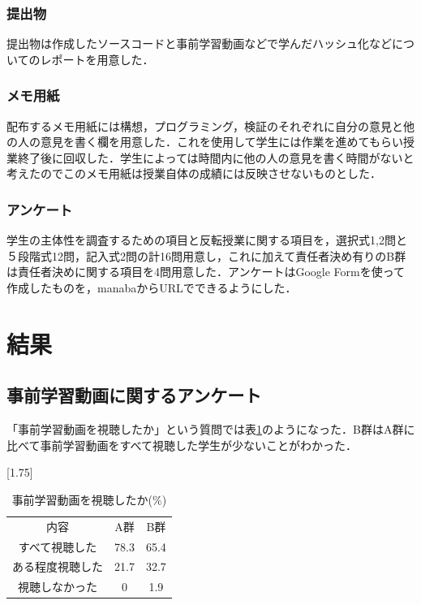 \documentclass[a4j,11pt]{jsarticle}
\begin{document}
\subsubsection{提出物}
提出物は作成したソースコードと事前学習動画などで学んだハッシュ化などについてのレポートを用意した．

\subsubsection{メモ用紙}
配布するメモ用紙には構想，プログラミング，検証のそれぞれに自分の意見と他の人の意見を書く欄を用意した．これを使用して学生には作業を進めてもらい授業終了後に回収した．学生によっては時間内に他の人の意見を書く時間がないと考えたのでこのメモ用紙は授業自体の成績には反映させないものとした．

\subsubsection{アンケート}
学生の主体性を調査するための項目と反転授業に関する項目を，選択式1,2問と５段階式12問，記入式2問の計16問用意し，これに加えて責任者決め有りのB群は責任者決めに関する項目を4問用意した．アンケートはGoogle Formを使って作成したものを，manabaからURLでできるようにした．

\newpage

\section{結果}
\subsection{事前学習動画に関するアンケート}
「事前学習動画を視聴したか」という質問では表\ref{anke1}のようになった．B群はA群に比べて事前学習動画をすべて視聴した学生が少ないことがわかった．


\begin{table}[htbp]
\begin{center}
\caption{事前学習動画を視聴したか(\%)}
\scalebox{1.75}[1.75]{
\begin{tabular}{|c|c|c|}
\cline{1-3}
内容 & A群 & B群  \\ \cline{1-3}  
 すべて視聴した& 78.3 & 65.4 \\ \cline{1-3}  
 ある程度視聴した& 21.7 & 32.7 \\ \cline{1-3}  
 視聴しなかった & 0 & 1.9 \\ \cline{1-3}  
\end{tabular}
}
\label{anke1}
\end{center}
\end{table}
\end{document}
